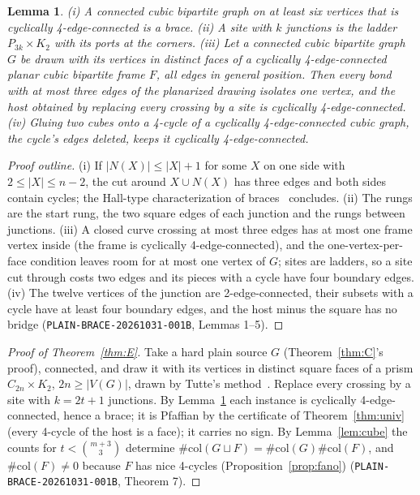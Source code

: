 \documentclass[11pt]{article}
\newtheorem{lemma}[theorem]{Lemma}
\theoremstyle{definition}
\theoremstyle{remark}
\newcommand{\col}{\#\mathrm{col}}
\begin{document}
\begin{lemma}\label{lem:braces}
(i) A connected cubic bipartite graph on at least six vertices that is
cyclically 4-edge-connected is a brace. (ii) A site with $k$ junctions is the
ladder $P_{3k}\times K_2$ with its ports at the corners. (iii) Let a connected
cubic bipartite graph $G$ be drawn with its vertices in distinct faces of a
cyclically 4-edge-connected planar cubic bipartite frame $F$, all edges in
general position. Then every bond with at most three edges of the planarized
drawing isolates one vertex, and the host obtained by replacing every crossing
by a site is cyclically 4-edge-connected. (iv) Gluing two cubes onto a
4-cycle of a cyclically 4-edge-connected cubic graph, the cycle's edges
deleted, keeps it cyclically 4-edge-connected.
\end{lemma}
\begin{proof}[Proof outline]
(i) If $|N(X)|\le|X|+1$ for some $X$ on one side with $2\le|X|\le n-2$, the cut
around $X\cup N(X)$ has three edges and both sides contain cycles; the Hall-type
characterization of braces~\cite{LP86} concludes. (ii) The rungs are the start
rung, the two square edges of each junction and the rungs between junctions.
(iii) A closed curve crossing at most three edges has at most one frame vertex
inside (the frame is cyclically 4-edge-connected), and the one-vertex-per-face
condition leaves room for at most one vertex of $G$; sites are ladders, so a
site cut through costs two edges and its pieces with a cycle have four boundary
edges. (iv) The twelve vertices of the junction are 2-edge-connected, their
subsets with a cycle have at least four boundary edges, and the host minus the
square has no bridge (\texttt{PLAIN-BRACE-20261031-001B}, Lemmas 1--5).
\end{proof}

\begin{proof}[Proof of Theorem~\ref{thm:E}]
Take a hard plain source $G$ (Theorem~\ref{thm:C}'s proof), connected, and draw
it with its vertices in distinct square faces of a prism $C_{2n}\times K_2$,
$2n\ge|V(G)|$, drawn by Tutte's method~\cite{Tut63}. Replace every crossing by
a site with $k=2t+1$ junctions. By Lemma~\ref{lem:braces} each instance is
cyclically 4-edge-connected, hence a brace; it is Pfaffian by the certificate
of Theorem~\ref{thm:univ} (every 4-cycle of the host is a face); it carries no
sign. By Lemma~\ref{lem:cube} the counts for $t<\binom{m+3}{3}$ determine
$\col(G\sqcup F)=\col(G)\col(F)$, and $\col(F)\ne0$ because $F$ has nice
4-cycles (Proposition~\ref{prop:fano})
(\texttt{PLAIN-BRACE-20261031-001B}, Theorem 7).
\end{proof}
\end{document}
